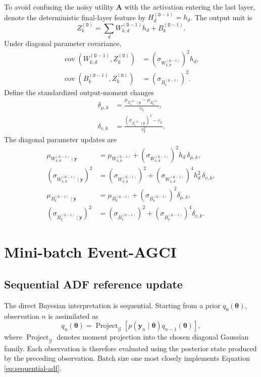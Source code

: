 \documentclass[11pt]{article}
\newcommand{\Cov}{\operatorname{cov}}
\newcommand{\Olayer}{\mathtt{O}}
\begin{document}
To avoid confusing the noisy utility $\bm A$ with the activation entering the
last layer, denote the deterministic final-layer feature by
$H_d^{(\Olayer-1)}=h_d$.  The
output unit is
\begin{equation}
 Z_k^{(\Olayer)}
 =
 \sum_d W_{k,d}^{(\Olayer-1)}h_d
 +B_k^{(\Olayer-1)}.
\end{equation}
Under diagonal parameter covariance,
\begin{align}
 \Cov\!\left(
 W_{k,d}^{(\Olayer-1)},Z_k^{(\Olayer)}
 \right)
 &=
 (\sigma_{W_{k,d}^{(\Olayer-1)}})^2h_d,
 \\
 \Cov\!\left(
 B_k^{(\Olayer-1)},Z_k^{(\Olayer)}
 \right)
 &=
 (\sigma_{B_k^{(\Olayer-1)}})^2.
\end{align}
Define the standardized output-moment changes
\begin{align}
 \delta_{\mu,k}
 &=
 \frac{
 \mu_{Z_k^{(\Olayer)}\mid\bm y}
 -\mu_{Z_k^{(\Olayer)}}
 }{v_k},
 \\
 \delta_{v,k}
 &=
 \frac{
 (\sigma_{Z_k^{(\Olayer)}\mid\bm y})^2-v_k
 }{v_k^2}.
\end{align}
The diagonal parameter updates are
\begin{align}
 \mu_{W_{k,d}^{(\Olayer-1)}\mid\bm y}
 &=
 \mu_{W_{k,d}^{(\Olayer-1)}}
 +(\sigma_{W_{k,d}^{(\Olayer-1)}})^2h_d\,\delta_{\mu,k},
 \\
 (\sigma_{W_{k,d}^{(\Olayer-1)}\mid\bm y})^2
 &=
 (\sigma_{W_{k,d}^{(\Olayer-1)}})^2
 +(\sigma_{W_{k,d}^{(\Olayer-1)}})^4h_d^2\,\delta_{v,k},
 \\
 \mu_{B_k^{(\Olayer-1)}\mid\bm y}
 &=
 \mu_{B_k^{(\Olayer-1)}}
 +(\sigma_{B_k^{(\Olayer-1)}})^2\delta_{\mu,k},
 \\
 (\sigma_{B_k^{(\Olayer-1)}\mid\bm y})^2
 &=
 (\sigma_{B_k^{(\Olayer-1)}})^2
 +(\sigma_{B_k^{(\Olayer-1)}})^4\delta_{v,k}.
\end{align}

\section{Mini-batch Event-AGCI}
\label{sec:minibatches}

\subsection{Sequential ADF reference update}

The direct Bayesian interpretation is sequential.  Starting from a prior
$q_0(\bm\theta)$, observation $n$ is assimilated as
\begin{equation}
 q_n(\bm\theta)
 =
 \operatorname{Project}_{\mathcal G}
 \left[
 p(\bm y_n\mid\bm\theta)q_{n-1}(\bm\theta)
 \right],
 \label{eq:sequential-adf}
\end{equation}
where $\operatorname{Project}_{\mathcal G}$ denotes moment projection into the
chosen diagonal Gaussian family.  Each observation is therefore evaluated
using the posterior state produced by the preceding observation.  Batch size
one most closely implements Equation \eqref{eq:sequential-adf}.
\end{document}
